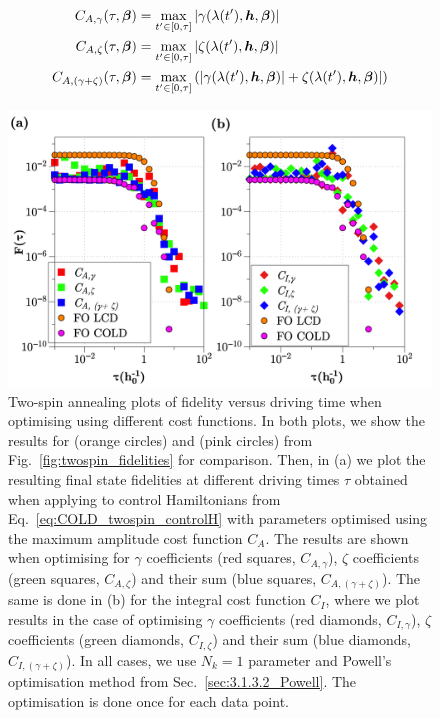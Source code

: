 \begin{equation}\label{eq:twospin_costfunc_amp}
    \begin{aligned}
        C_{A, \gamma}(\tau, \boldsymbol{\beta}) &= \max_{t^{\prime} \in [0,\tau]} | \gamma(\lambda(t^{\prime}), \boldsymbol{h}, \boldsymbol{\beta})| \\
        C_{A, \zeta}(\tau, \boldsymbol{\beta}) &= \max_{t^{\prime} \in [0,\tau]} | \zeta(\lambda(t^{\prime}), \boldsymbol{h}, \boldsymbol{\beta})| \\
        C_{A, (\gamma + \zeta)}(\tau, \boldsymbol{\beta}) &= \max_{t^{\prime} \in [0,\tau]} \left(| \gamma(\lambda(t^{\prime}), \boldsymbol{h}, \boldsymbol{\beta})| + \zeta(\lambda(t^{\prime}), \boldsymbol{h}, \boldsymbol{\beta})| \right)
    \end{aligned}
\end{equation}

\begin{figure}[h]
    \centering
    \includegraphics[width=0.8\linewidth]{images/twospin_HO_scatter.png} \caption[Two-spin annealing plots of fidelity versus driving time when minimising different orders of LCD.]{Two-spin annealing plots of fidelity versus driving time when optimising using different cost functions. In both plots, we show the results for   (orange circles) and   (pink circles) from Fig.~\ref{fig:twospin_fidelities} for comparison. Then, in (a) we plot the resulting final state fidelities at different driving times $\tau$ obtained when applying   to control Hamiltonians from Eq.~\eqref{eq:COLD_twospin_controlH} with parameters optimised using the maximum amplitude cost function $C_A$. The results are shown when optimising for $\gamma$ coefficients (red squares, $C_{A, \gamma}$), $\zeta$ coefficients (green squares, $C_{A, \zeta}$) and their sum (blue squares, $C_{A, (\gamma + \zeta)}$). The same is done in (b) for the integral cost function $C_I$, where we plot results in the case of optimising $\gamma$ coefficients (red diamonds, $C_{I, \gamma}$), $\zeta$ coefficients (green diamonds, $C_{I, \zeta}$) and their sum (blue diamonds, $C_{I, (\gamma + \zeta)}$). In all cases, we use $N_k = 1$ parameter and Powell's optimisation method from Sec.~\ref{sec:3.1.3.2_Powell}. The optimisation is done once for each data point.}\label{fig:twospin_scatter}
\end{figure}


